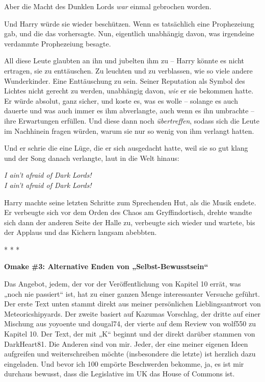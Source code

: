 {Aber die Macht des Dunklen Lords \emph{war} einmal gebrochen worden.

Und Harry würde sie wieder beschützen. Wenn es tatsächlich eine Prophezeiung gab, und die das vorhersagte. Nun, eigentlich unabhängig davon, was irgendeine verdammte Prophezeiung besagte.

All diese Leute glaubten an ihn und jubelten ihm zu -- Harry könnte es nicht ertragen, sie zu enttäuschen. Zu leuchten und zu verblassen, wie so viele andere Wunderkinder. Eine Enttäuschung zu sein. Seiner Reputation als Symbol des Lichtes nicht gerecht zu werden, unabhängig davon, \emph{wie} er sie bekommen hatte. Er würde absolut, ganz sicher, und koste es, was es wolle -- solange es auch dauerte und was auch immer es ihm abverlangte, auch wenn es ihn umbrachte -- ihre Erwartungen erfüllen. Und diese dann noch \emph{übertreffen}, sodass sich die Leute im Nachhinein fragen würden, warum sie nur so wenig von ihm verlangt hatten.

Und er schrie die eine Lüge, die er sich ausgedacht hatte, weil sie so gut klang und der Song danach verlangte, laut in die Welt hinaus:

\emph{I ain't afraid of Dark Lords!\\ I ain't afraid of Dark Lords!}

Harry machte seine letzten Schritte zum Sprechenden Hut, als die Musik endete. Er verbeugte sich vor dem Orden des Chaos am Gryffindortisch, drehte wandte sich dann der anderen Seite der Halle zu, verbeugte sich wieder und wartete, bis der Applaus und das Kichern langsam abebbten.

* * *

\textbf{Omake \#3: Alternative Enden von „Selbst-Bewusstsein“}

Das Angebot, jedem, der vor der Veröffentlichung von Kapitel 10 errät, was „noch nie passiert“ ist, hat zu einer ganzen Menge interessanter Versuche geführt. Der erste Text unten stammt direkt aus meiner persönlichen Lieblingsantwort von Meteoricshipyards. Der zweite basiert auf Kazumas Vorschlag, der dritte auf einer Mischung aus yoyoente und dougal74, der vierte auf dem Review von wolf550 zu Kapitel 10. Der Text, der mit „K“ beginnt und der direkt darüber stammen von DarkHeart81. Die Anderen sind von mir. Jeder, der eine meiner eigenen Ideen aufgreifen und weiterschreiben möchte (insbesondere die letzte) ist herzlich dazu eingeladen. Und bevor ich 100 empörte Beschwerden bekomme, ja, es ist mir durchaus bewusst, dass die Legislative im UK das House of Commons ist.

}
